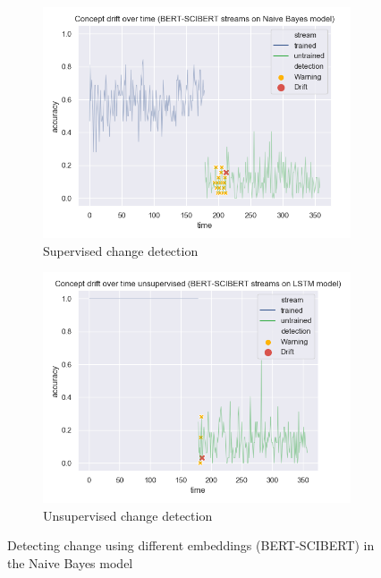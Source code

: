 \documentclass[12pt]{report}
\begin{document}
\begin{figure}[H]
\centering
\begin{subfigure}{.5\textwidth}
  \centering
  \includegraphics[width=\linewidth]{assets/detecting-change/diff_embed_nb_wos_1_BERT_SCIBERT.png}
  \caption{Supervised change detection}
  \label{fig:nb-diff-embed-super-B-S}
\end{subfigure}%
\begin{subfigure}{.5\textwidth}
  \centering
  \includegraphics[width=\linewidth]{assets/detecting-change/diff_embed_nb_wos_1_BERT_SCIBERT_unsupervised.png}
  \caption{Unsupervised change detection}
  \label{fig:nb-diff-embed-unsuper-B-S}
\end{subfigure}
\caption{Detecting change using different embeddings (BERT-SCIBERT) in the Naive Bayes model}
\label{fig:nb-diff-embed-B-S}
\end{figure}
\end{document}
